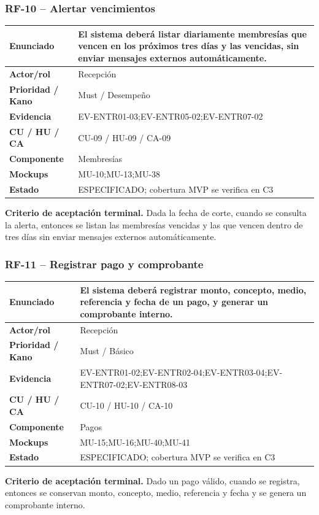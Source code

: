 \documentclass[11pt,a4paper,twoside]{article}
\begin{document}
\subsubsection{RF-10 -- Alertar vencimientos}
\begin{tabularx}{\textwidth}{|>{\bfseries}p{3.2cm}|X|}\hline
Enunciado & El sistema deberá listar diariamente membresías que vencen en los próximos tres días y las vencidas, sin enviar mensajes externos automáticamente. \\ \hline
Actor/rol & Recepción \\ \hline
Prioridad / Kano & Must / Desempeño \\ \hline
Evidencia & EV-ENTR01-03;EV-ENTR05-02;EV-ENTR07-02 \\ \hline
CU / HU / CA & CU-09 / HU-09 / CA-09 \\ \hline
Componente & Membresías \\ \hline
Mockups & MU-10;MU-13;MU-38 \\ \hline
Estado & ESPECIFICADO; cobertura MVP se verifica en C3 \\ \hline
\end{tabularx}
\textbf{Criterio de aceptación terminal.} Dada la fecha de corte, cuando se consulta la alerta, entonces se listan las membresías vencidas y las que vencen dentro de tres días sin enviar mensajes externos automáticamente.
\subsubsection{RF-11 -- Registrar pago y comprobante}
\begin{tabularx}{\textwidth}{|>{\bfseries}p{3.2cm}|X|}\hline
Enunciado & El sistema deberá registrar monto, concepto, medio, referencia y fecha de un pago, y generar un comprobante interno. \\ \hline
Actor/rol & Recepción \\ \hline
Prioridad / Kano & Must / Básico \\ \hline
Evidencia & EV-ENTR01-02;EV-ENTR02-04;EV-ENTR03-04;EV-ENTR07-02;EV-ENTR08-03 \\ \hline
CU / HU / CA & CU-10 / HU-10 / CA-10 \\ \hline
Componente & Pagos \\ \hline
Mockups & MU-15;MU-16;MU-40;MU-41 \\ \hline
Estado & ESPECIFICADO; cobertura MVP se verifica en C3 \\ \hline
\end{tabularx}
\textbf{Criterio de aceptación terminal.} Dado un pago válido, cuando se registra, entonces se conservan monto, concepto, medio, referencia y fecha y se genera un comprobante interno.
\end{document}
